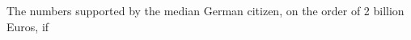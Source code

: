 \documentclass[12pt,oneside,smallheadings,chapterprefix=true]{article}
\begin{document}
The numbers supported by the median German citizen, on the order of 2 billion Euros, if 














\clearpage
\setcounter{page}{1}

\begin{center}
\end{center}


\end{document}
